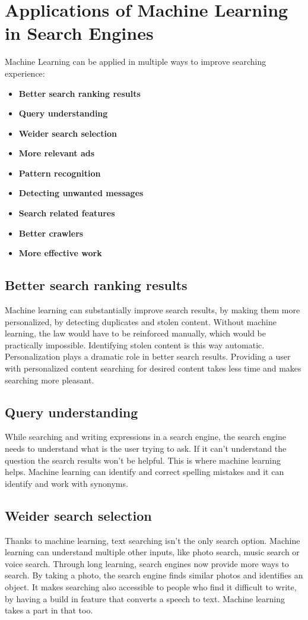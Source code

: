 \documentclass[10pt,a4paper]{article}
\begin{document}
\section{Applications of Machine Learning in Search Engines}
Machine Learning can be applied in multiple ways to improve searching experience\cite{Sunny:MLiSE}:

\begin{itemize}
\item \textbf{Better search ranking results} 
\item \textbf{Query understanding}
\item \textbf{Weider search selection} 
\item \textbf{More relevant ads} 
\item \textbf{Pattern recognition} 
\item \textbf{Detecting unwanted messages}
\item \textbf{Search related features} 
\item \textbf{Better crawlers} 
\item \textbf{More effective work} 
\end{itemize}

\subsection{Better search ranking results}
\cite{Sunny:MLiSE}Machine learning can substantially improve search results, by making them more personalized, by detecting duplicates and stolen content. Without machine learning, the law would have to be reinforced manually, which would be practically impossible. Identifying stolen content is this way automatic. Personalization plays a dramatic role in better search results. Providing a user with personalized content searching for desired content takes less time and makes searching more pleasant.
\subsection{Query understanding}
\cite{Sunny:MLiSE}While searching and writing expressions in a search engine, the search engine needs to understand what is the user trying to ask. If it can't understand the question the search results won't be helpful. This is where machine learning helps. Machine learning can identify and correct spelling mistakes and it can identify and work with synonyms. 
\subsection{Weider search selection}
\cite{Sunny:MLiSE}Thanks to machine learning, text searching isn't the only search option. Machine learning can understand multiple other inputs, like photo search, music search or voice search. Through long learning, search engines now provide more ways to search. By taking a photo, the search engine finds similar photos and identifies an object. It makes searching also accessible to people who find it difficult to write, by having a build in feature that converts a speech to text. Machine learning takes a part in that too. 
\end{document}
